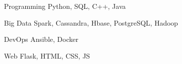 


\begin{cvskills}


\cvskill
{Programming}
{Python, SQL, C++, Java}


\cvskill
{Big Data}
{Spark, Cassandra, Hbase, PostgreSQL, Hadoop}


\cvskill
{DevOps}
{Ansible, Docker}


\cvskill
{Web}
{Flask, HTML, CSS, JS}



\end{cvskills}